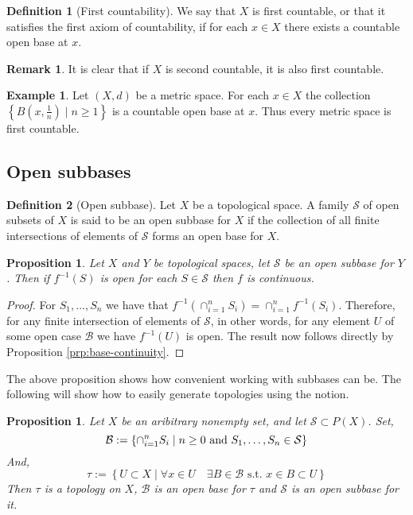 \documentclass[11pt,a4paper]{article}
\theoremstyle{definition}
\newtheorem{definition}{Definition}[section]
\newtheorem{remark}{Remark}[section]
\newtheorem{example}{Example}[section]
\theoremstyle{plain}
\newtheorem{proposition}[theorem]{Proposition}
\newcommand{\st}{\text{ s.t. }}
\newcommand{\set}[2]{ \left\{ #1 \mid #2 \right\} }
\begin{document}
  \begin{definition}[First countability]
    We say that $X$ is first countable, or that it satisfies the first
    axiom of countability, if for each $x \in X$ there exists a countable 
    open base at $x$.
  \end{definition}

  \begin{remark}
    It is clear that if $X$ is second countable, it is also first countable.
  \end{remark}

  \begin{example}
    Let $(X, d)$ be a metric space. For each $x \in X$ the collection
    $\set{B(x, \frac{1}{n})}{n \geq 1}$ is a countable open base at $x$. 
    Thus every metric space is first countable.
  \end{example}

  \subsection{Open subbases}

  \begin{definition}[Open subbase]
    Let $X$ be a topological space. A family $\mathcal{S}$ of open subsets 
    of $X$ is said to be an open subbase for $X$ if the collection of all 
    finite intersections of elements of $\mathcal{S}$ forms an open base 
    for $X$.
  \end{definition}

  \begin{proposition}
    Let $X$ and $Y$ be topological spaces, let $\mathcal{S}$ be an open
    subbase for $Y$. Then if $f^{-1}(S)$ is open for each $S \in \mathcal{S}$
    then $f$ is continuous.
  \end{proposition}
  \begin{proof}
    For $S_1,\dots,S_n$ we have that 
    $f^{-1}(\cap_{i=1}^{n} S_i) = \cap_{i=1}^{n} f^{-1}(S_i)$.
    Therefore, for any finite intersection of elements of $\mathcal S$,
    in other words, for any element $U$ of some open case $\mathcal B$
    we have $f^{-1}(U)$ is open. The result now follows directly by 
    Proposition \ref{prp:base-continuity}.
  \end{proof}

  The above proposition shows how convenient working with subbases can be.
  The following will show how to easily generate topologies using the notion.

  \begin{proposition}
    Let $X$ be an aribitrary nonempty set, 
    and let $\mathcal{S} \subset P(X)$. Set,
    \[
      \mathcal{B} := \set{\cap_{i=1}^{n}{S_i}}{n \geq 0 \textnormal{ and }
      S_1,\dots,S_n \in \mathcal{S}}
    \]
    And,
    \[
      \tau := \set{U \subset X}{\forall x \in U \quad \exists B \in 
      \mathcal{B} \st x \in B \subset U}
    \]
    Then $\tau$ is a topology on $X$, $\mathcal{B}$ is an open base for 
    $\tau$ and $\mathcal{S}$ is an open subbase for it.
  \end{proposition}
\end{document}
